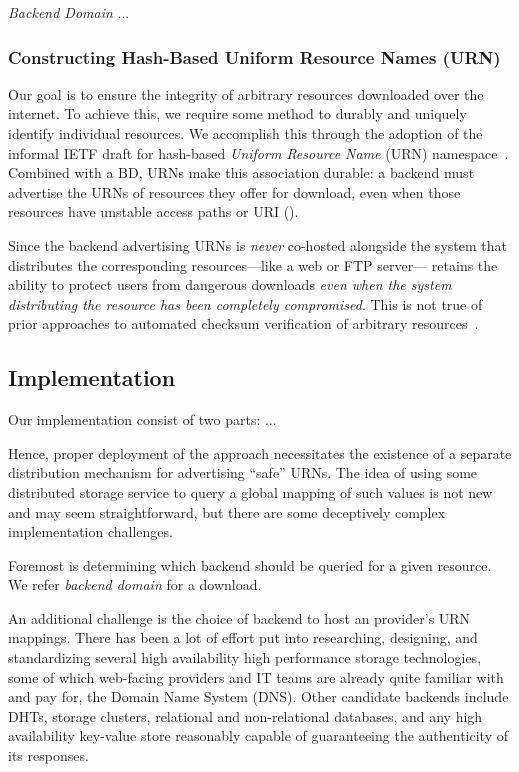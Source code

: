 
\emph{Backend Domain} ...

\subsubsection{Constructing Hash-Based Uniform Resource Names (URN)}

Our goal is to ensure the integrity of arbitrary resources downloaded over the
internet. To achieve this, we require some method to durably and uniquely
identify individual resources. We accomplish this through the adoption of the
informal IETF draft for hash-based \emph{Uniform Resource Name} (URN)
namespace~\cite{draft-URN}. Combined with a BD, URNs make this association
durable: a backend must advertise the URNs of resources they offer for download,
even when those resources have unstable access paths or URI ().

Since the backend advertising URNs is \emph{never} co-hosted alongside the
system that distributes the corresponding resources---like a web or FTP
server---\SYSTEM{} retains the ability to protect users from dangerous downloads
\emph{even when the system distributing the resource has been completely
compromised}. This is not true of prior approaches to automated checksum
verification of arbitrary resources~\cite{Cherubini}.

\subsection{Implementation}



Our \SYSTEM{} implementation consist of two parts: ...

Hence, proper deployment of the \SYSTEM{} approach necessitates the existence of
a separate distribution mechanism for advertising ``safe'' URNs. The idea of
using some distributed storage service to query a global mapping of such values
is not new and may seem straightforward, but there are some deceptively complex
implementation challenges.

Foremost is determining which backend should be queried for a
given resource. We refer \emph{backend domain} for a download. 

An additional challenge is the choice of backend to host an
provider's URN mappings. There has been a lot of effort put into researching,
designing, and standardizing several high availability high performance storage
technologies, some of which web-facing providers and IT teams are already quite
familiar with and pay for, \eg the Domain Name System (DNS). Other candidate
backends include DHTs, storage clusters, relational and
non-relational databases, and any high availability key-value store reasonably
capable of guaranteeing the authenticity of its responses.

